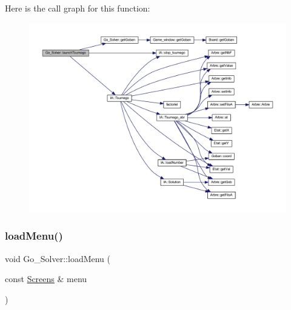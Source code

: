 Here is the call graph for this function\+:
\nopagebreak
\begin{figure}[H]
\begin{center}
\leavevmode
\includegraphics[width=350pt]{class_go___solver_a6ca744f1f4586c3f90f2e47915034baf_cgraph}
\end{center}
\end{figure}
\mbox{\label{class_go___solver_a27ceb252dd57ac88d0dc2dbb04a25e32}} 
\subsubsection{\texorpdfstring{load\+Menu()}{loadMenu()}}
{\footnotesize\ttfamily void Go\+\_\+\+Solver\+::load\+Menu (\begin{DoxyParamCaption}\item[{const \hyperlink{_globals_8h_a3d5776bab98402b03be09156bacf4f68}{Screens} \&}]{menu }\end{DoxyParamCaption})}

